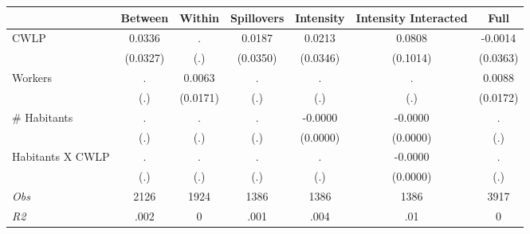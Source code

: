 \begin{tabular}{l*{6}{c}}\hline&\multicolumn{1}{c}{Between}&\multicolumn{1}{c}{Within}&\multicolumn{1}{c}{Spillovers}&\multicolumn{1}{c}{Intensity}&\multicolumn{1}{c}{Intensity Interacted}&\multicolumn{1}{c}{Full}\\ \hline 
CWLP & 0.0336 & . & 0.0187 & 0.0213 & 0.0808 & -0.0014 \\
 & (0.0327) & (.) & (0.0350) & (0.0346) & (0.1014) & (0.0363) \\
Workers & . & 0.0063 & . & . & . & 0.0088 \\
 & (.) & (0.0171) & (.) & (.) & (.) & (0.0172) \\
\# Habitants & . & . & . & -0.0000 & -0.0000 & . \\
 & (.) & (.) & (.) & (0.0000) & (0.0000) & (.) \\
Habitants X CWLP & . & . & . & . & -0.0000 & . \\
 & (.) & (.) & (.) & (.) & (0.0000) & (.) \\
\hline \textit{Obs} & 2126 & 1924 & 1386 & 1386 & 1386 & 3917 \\ \textit{R2} & .002 & 0 & .001 & .004 & .01 & 0 \\ \hline \end{tabular}
